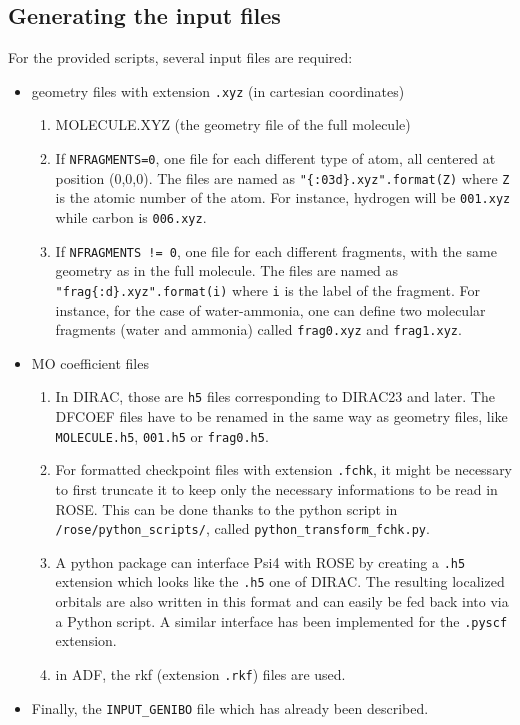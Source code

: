 \documentclass[preprint]{revtex4-1}
\begin{document}
\begin{itemize}
\subsection{Generating the input files}
For the provided scripts, several input files are required:
\begin{itemize}
\item geometry files with extension \verb|.xyz| (in cartesian coordinates)
\begin{enumerate}
\item MOLECULE.XYZ (the geometry file of the full molecule)
\item If \verb|NFRAGMENTS=0|, one file for each different type of atom, all centered 
at position (0,0,0). The files are named as \verb|"{:03d}.xyz".format(Z)| where \verb|Z|
is the atomic number of the atom. For instance, hydrogen will be \verb|001.xyz| while
carbon is \verb|006.xyz|.
\item  If \verb|NFRAGMENTS != 0|, one file for each different fragments, with the
same geometry as in the full molecule. The files are named as 
\verb|"frag{:d}.xyz".format(i)| where \verb|i|
is the label of the fragment. For instance, for the case of water-ammonia, one can define two 
molecular fragments (water and ammonia) called \verb|frag0.xyz| and \verb|frag1.xyz|.
\end{enumerate}
\item MO coefficient files
\begin{enumerate}
\item In DIRAC, those are \verb|h5| files corresponding to DIRAC23 and later. The DFCOEF files have to be renamed in the same way as 
geometry files, like \verb|MOLECULE.h5|, \verb|001.h5| or \verb|frag0.h5|.
\item For formatted checkpoint files with extension \verb|.fchk|,
it might
be necessary to first truncate it to keep only the necessary informations to be read in ROSE.
This can be done thanks to the python script in \verb|/rose/python_scripts/|, called
\verb|python_transform_fchk.py|.
\item A python package can interface Psi4 with ROSE by creating a \verb|.h5| extension which looks like the \verb|.h5| one of DIRAC. The resulting localized orbitals are also written in this format and can easily be
fed back into via a Python script. A similar interface has been implemented for the \verb|.pyscf| extension.
\item in ADF, the rkf  (extension \verb|.rkf|) files are used.
\end{enumerate}
\item Finally, the \verb|INPUT_GENIBO| file which has already been described.
\end{itemize}


\end{itemize}
\end{document}
